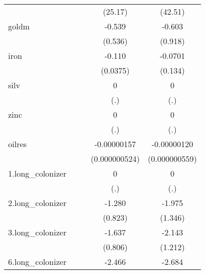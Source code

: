 {\begin{tabular}{l*{4}{c}}
            &                     &                     &     (25.17)         &     (42.51)         \\
[1em]
goldm       &                     &                     &      -0.539         &      -0.603         \\
            &                     &                     &     (0.536)         &     (0.918)         \\
[1em]
iron        &                     &                     &      -0.110\sym{**} &     -0.0701         \\
            &                     &                     &    (0.0375)         &     (0.134)         \\
[1em]
silv        &                     &                     &           0         &           0         \\
            &                     &                     &         (.)         &         (.)         \\
[1em]
zinc        &                     &                     &           0         &           0         \\
            &                     &                     &         (.)         &         (.)         \\
[1em]
oilres      &                     &                     & -0.00000157\sym{**} & -0.00000120\sym{*}  \\
            &                     &                     &(0.000000524)         &(0.000000559)         \\
[1em]
1.long\_colonizer&                     &                     &           0         &           0         \\
            &                     &                     &         (.)         &         (.)         \\
[1em]
2.long\_colonizer&                     &                     &      -1.280         &      -1.975         \\
            &                     &                     &     (0.823)         &     (1.346)         \\
[1em]
3.long\_colonizer&                     &                     &      -1.637\sym{*}  &      -2.143         \\
            &                     &                     &     (0.806)         &     (1.212)         \\
[1em]
6.long\_colonizer&                     &                     &      -2.466\sym{*}  &      -2.684         \\

\end{tabular}}
